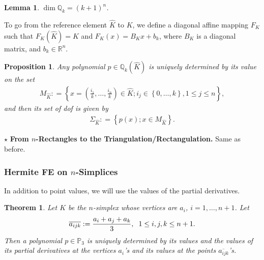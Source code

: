 \documentclass[11pt,a4paper,center,notitlepage]{article}
\numberwithin{equation}{section}
\newtheorem{lemma}{Lemma}[section]
\newtheorem{prop}{Proposition}[section]
\newtheorem{theorem}{Theorem}[section]
\begin{document}
\begin{lemma}
$\dim \mathbb{Q}_k= \left(k+1\right)^n$.
\end{lemma}
To go from the reference element $\widehat{K}$ to $K$, we define a diagonal affine mapping $F_K$ such that $F_K\left(\widehat{K}\right)=K$ and $F_K\left(x\right)=B_Kx +b_k$, where $B_K$ is a diagonal matrix, and $b_k\in \mathbb{R}^n$.
\begin{prop}
Any polynomial $p\in \mathbb{Q}_k \left(\widehat{K}\right)$ is uniquely determined by its value on the set
\begin{align}
{M_{\widehat K}}: = \left\{ {x = \left( {\frac{{{i_1}}}{k}, \ldots ,\frac{{{i_n}}}{k}} \right) \in \widehat K;{i_j} \in \left\{ {0, \ldots ,k} \right\},1 \le j \le n} \right\},
\end{align}
and then its set of dof is given by
\begin{align}
{\Sigma _{\widehat K}}: = \left\{ {p\left( x \right);x \in {M_{\widehat K}}} \right\}.
\end{align}
\end{prop}
\noindent
$\star$ \textbf{From $n$-Rectangles to the Triangulation/Rectangulation.} Same as before.

\subsubsection{Hermite FE on $n$-Simplices}
In addition to point values, we will use the values of the partial derivatives.
\begin{theorem}
Let $K$ be the $n$-simplex whose vertices are $a_i$, $i=1,\ldots,n+1$. Let 
\begin{align}
\overline {{a_{ijk}}} : = \frac{{{a_i} + {a_j} + {a_k}}}{3}, \hspace{2mm} 1 \le i,j,k \le n + 1.
\end{align}
Then a polynomial $p\in \mathbb{P}_3$ is uniquely determined by its values and the values of its partial derivatives at the vertices $a_i$'s and its values at the points $\overline{a_{ijk}}$'s.
\end{theorem}
\end{document}

